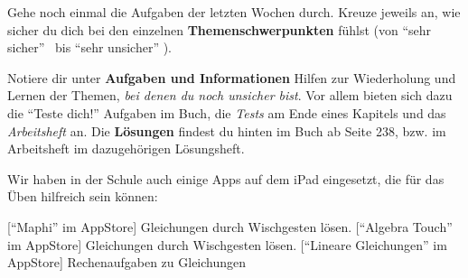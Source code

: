 \documentclass[a4paper,ngerman,fontsize=10pt]{scrartcl}
\begin{document}
\CheckupBild\CheckupTitel

Gehe noch einmal die Aufgaben der letzten Wochen durch. Kreuze jeweils an, wie
sicher du dich bei den einzelnen \textbf{Themenschwerpunkten} fühlst (von
\enquote{sehr sicher} \iconLachen\ bis \enquote{sehr unsicher} \iconTraurig).

Notiere dir unter \textbf{Aufgaben und Informationen} Hilfen zur Wiederholung
und Lernen der Themen, \emph{bei denen du noch unsicher bist}. Vor allem bieten
sich dazu die \enquote{Teste dich!} Aufgaben im Buch, die \emph{Tests} am Ende
eines Kapitels und das \emph{Arbeitsheft} an. Die \textbf{Lösungen} findest du
hinten im Buch ab Seite 238, bzw. im Arbeitsheft im dazugehörigen Lösungsheft.

Wir haben in der Schule auch einige Apps auf dem iPad eingesetzt, die für das
Üben hilfreich sein können:

[\enquote{Maphi} im AppStore]{
	Gleichungen durch Wischgesten lösen.
}
[\enquote{Algebra Touch} im AppStore]{
	Gleichungen durch Wischgesten lösen.
}
[\enquote{Lineare Gleichungen} im AppStore]{
	Rechenaufgaben zu Gleichungen
}

\begin{checkup}
\end{checkup}
\end{document}
